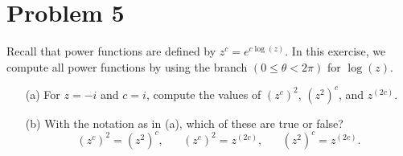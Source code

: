 \documentclass{article}
\begin{document}
\section*{Problem 5}
Recall that power functions are defined by $z^c = e^{c \log(z)}$. In this exercise, we compute all power functions by using the branch $(0 \leq \theta < 2 \pi)$ for $\log(z)$.
\begin{enumerate}
	\item [(a)] For $z = -i$ and $c = i$, compute the values of $(z^c)^2$, $(z^2)^c$, and $z^{(2c)}$.
	\item [(b)] With the notation as in (a), which of these are true or false?
	      $$ (z^c)^2 = (z^2)^c, \hspace{20pt} (z^c)^2 = z^{(2c)}, \hspace{20pt} (z^2)^c = z^{(2c)}.$$

\end{enumerate}
\end{document}
